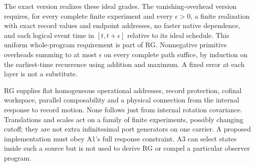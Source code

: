 The exact version realizes these ideal grades. The vanishing-overhead
version requires, for every complete finite experiment and every
$\epsilon>0$, a finite realization with exact record values and endpoint
addresses, no faster native dependence, and each logical event time in
$[t,t+\epsilon]$ relative to its ideal schedule. This uniform whole-program
requirement is part of RG. Nonnegative primitive overheads summing to at
most $\epsilon$ on every complete path suffice, by induction on the
earliest-time recurrence using addition and maximum. A fixed error at
each layer is not a substitute.

RG supplies flat homogeneous operational addresses, record protection,
cofinal workspace, parallel composability and a physical connection from
the internal response to record motion. None follows just from internal
rotation covariance. Translations and scales act on a family of finite
experiments, possibly changing cutoff; they are not extra infinitesimal
port generators on one carrier. A proposed implementation must obey
A1's full response constraint. A3 can select states inside such a source
but is not used to derive RG or compel a particular observer program.


